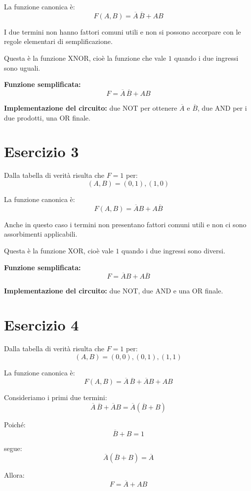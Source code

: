 \documentclass[a4paper,12pt]{article}
\begin{document}
	La funzione canonica è:
	\[
	F(A,B)=\overline{A}\,\overline{B}+AB
	\]
	
	I due termini non hanno fattori comuni utili e non si possono accorpare con le regole elementari di semplificazione.
	
	Questa è la funzione XNOR, cioè la funzione che vale $1$ quando i due ingressi sono uguali.
	
	\textbf{Funzione semplificata:}
	\[
	\boxed{F=\overline{A}\,\overline{B}+AB}
	\]
	
	\textbf{Implementazione del circuito:} due NOT per ottenere $\overline{A}$ e $\overline{B}$, due AND per i due prodotti, una OR finale.
	
	\bigskip
	
	\section*{Esercizio 3}
	
	Dalla tabella di verità risulta che $F=1$ per:
	\[
	(A,B)=(0,1),(1,0)
	\]
	
	La funzione canonica è:
	\[
	F(A,B)=\overline{A}B+A\overline{B}
	\]
	
	Anche in questo caso i termini non presentano fattori comuni utili e non ci sono assorbimenti applicabili.
	
	Questa è la funzione XOR, cioè vale $1$ quando i due ingressi sono diversi.
	
	\textbf{Funzione semplificata:}
	\[
	\boxed{F=\overline{A}B+A\overline{B}}
	\]
	
	\textbf{Implementazione del circuito:} due NOT, due AND e una OR finale.
	
	\bigskip
	
	\section*{Esercizio 4}
	
	Dalla tabella di verità risulta che $F=1$ per:
	\[
	(A,B)=(0,0),(0,1),(1,1)
	\]
	
	La funzione canonica è:
	\[
	F(A,B)=\overline{A}\,\overline{B}+\overline{A}B+AB
	\]
	
	Consideriamo i primi due termini:
	\[
	\overline{A}\,\overline{B}+\overline{A}B=\overline{A}(\overline{B}+B)
	\]
	
	Poiché:
	\[
	\overline{B}+B=1
	\]
	
	segue:
	\[
	\overline{A}(\overline{B}+B)=\overline{A}
	\]
	
	Allora:
	\[
	F=\overline{A}+AB
	\]
	
\end{document}
